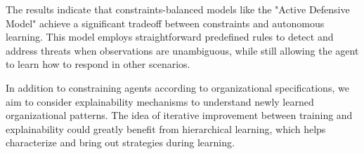 The results indicate that constraints-balanced models like the "Active Defensive Model" achieve a significant tradeoff between constraints and autonomous learning. This model employs straightforward predefined rules to detect and address threats when observations are unambiguous, while still allowing the agent to learn how to respond in other scenarios.

In addition to constraining agents according to organizational specifications, we aim to consider explainability mechanisms to understand newly learned organizational patterns. The idea of iterative improvement between training and explainability could greatly benefit from hierarchical learning, which helps characterize and bring out strategies during learning.



